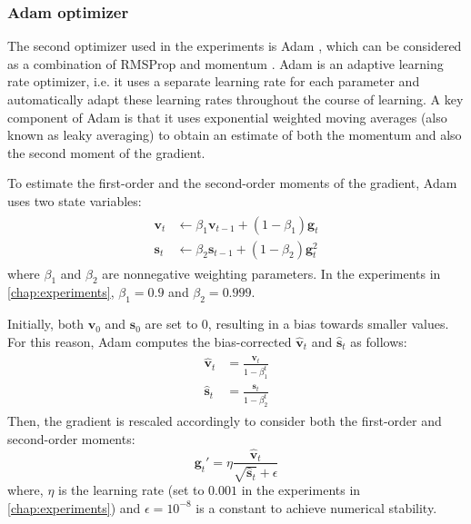 \subsubsection{Adam optimizer}
The second optimizer used in the experiments is Adam \cite{kingma2014adam}, which can be considered as a combination of RMSProp \cite{hinton2012neural} and momentum \cite{sutskever2013importance}. Adam is an adaptive learning rate optimizer, i.e. it uses a separate learning rate for each parameter and automatically adapt these learning rates throughout the course of learning. A key component of Adam is that it uses exponential weighted moving averages (also known as leaky averaging) to obtain an estimate of both the momentum and also the second moment of the gradient.

To estimate the first-order and the second-order moments of the gradient, Adam uses two state variables:
\begin{equation}
    \begin{split}\begin{aligned}
        \mathbf{v}_t & \leftarrow \beta_1 \mathbf{v}_{t-1} + (1 - \beta_1) \mathbf{g}_t \\
        \mathbf{s}_t & \leftarrow \beta_2 \mathbf{s}_{t-1} + (1 - \beta_2) \mathbf{g}_t^2
    \end{aligned}\end{split}
\end{equation}
where $\beta_1$ and $\beta_2$ are nonnegative weighting parameters. In the experiments in \autoref{chap:experiments}, $\beta_1=0.9$ and $\beta_2=0.999$.

Initially, both $\mathbf{v}_0$ and $\mathbf{s}_0$ are set to 0, resulting in a bias towards smaller values. For this reason, Adam computes the bias-corrected $\hat{\mathbf{v}}_t$ and $\hat{\mathbf{s}}_t$ as follows:
\begin{equation}
    \begin{split}\begin{aligned}
        \hat{\mathbf{v}}_t & = \frac{\mathbf{v}_t}{1 - \beta_1^t} \\
        \hat{\mathbf{s}}_t & = \frac{\mathbf{s}_t}{1 - \beta_2^t}
    \end{aligned}\end{split}
\end{equation}
Then, the gradient is rescaled accordingly to consider both the first-order and second-order moments:
\begin{equation}
    \mathbf{g}_t' = \eta \frac{ \hat{\mathbf{v}}_t}{\sqrt{\hat{\mathbf{s}}_t} + \epsilon}
\end{equation}
where, $\eta$ is the learning rate (set to $0.001$ in the experiments in \autoref{chap:experiments}) and $\epsilon = 10^{-8}$ is a constant to achieve numerical stability.

